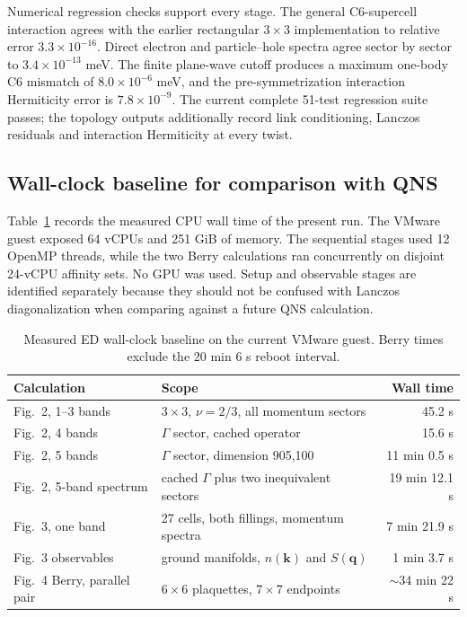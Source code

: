 \documentclass[10pt,twocolumn]{article}
\begin{document}
Numerical regression checks support every stage.  The general C6-supercell interaction agrees with the earlier rectangular $3\times3$ implementation to relative error $3.3\times10^{-16}$.  Direct electron and particle--hole spectra agree sector by sector to $3.4\times10^{-13}$ meV.  The finite plane-wave cutoff produces a maximum one-body C6 mismatch of $8.0\times10^{-6}$ meV, and the pre-symmetrization interaction Hermiticity error is $7.8\times10^{-9}$.  The current complete 51-test regression suite passes; the topology outputs additionally record link conditioning, Lanczos residuals and interaction Hermiticity at every twist.

\subsection{Wall-clock baseline for comparison with QNS}

Table~\ref{tab:edruntime} records the measured CPU wall time of the present
run.  The VMware guest exposed 64 vCPUs and 251 GiB of memory.  The sequential
stages used 12 OpenMP threads, while the two Berry calculations ran concurrently
on disjoint 24-vCPU affinity sets.  No GPU was used.  Setup and observable stages
are identified separately because they should not be confused with Lanczos
diagonalization when comparing against a future QNS calculation.

\begin{table}[t]
\centering
\caption{Measured ED wall-clock baseline on the current VMware guest.  Berry
times exclude the 20 min 6 s reboot interval.}
\label{tab:edruntime}
\begin{tabular}{@{}llr@{}}
\toprule
Calculation & Scope & Wall time \\
\midrule
Fig.~2, 1--3 bands & $3\times3$, $\nu=2/3$, all momentum sectors & 45.2 s \\
Fig.~2, 4 bands & $\Gamma$ sector, cached operator & 15.6 s \\
Fig.~2, 5 bands & $\Gamma$ sector, dimension 905,100 & 11 min 0.5 s \\
Fig.~2, 5-band spectrum & cached $\Gamma$ plus two inequivalent sectors & 19 min 12.1 s \\
Fig.~3, one band & 27 cells, both fillings, momentum spectra & 7 min 21.9 s \\
Fig.~3 observables & ground manifolds, $n(\bm k)$ and $S(\bm q)$ & 1 min 3.7 s \\
Fig.~4 Berry, parallel pair & $6\times6$ plaquettes, $7\times7$ endpoints & $\sim$34 min 22 s \\
\bottomrule
\end{tabular}
\end{table}
\end{document}
